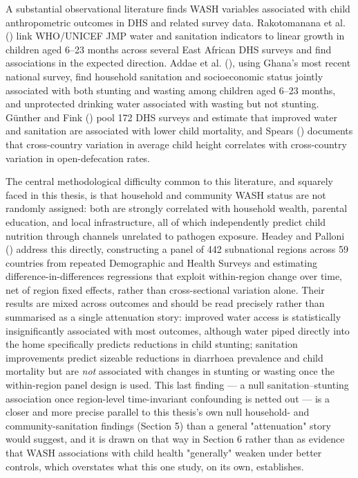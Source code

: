 A substantial observational literature finds WASH variables associated with child anthropometric outcomes in DHS and related survey data. Rakotomanana et al. (\citeyear{Rakotomanana2020}) link WHO/UNICEF JMP water and sanitation indicators to linear growth in children aged 6--23 months across several East African DHS surveys and find associations in the expected direction. Addae et al. (\citeyear{Addae2024}), using Ghana's most recent national survey, find household sanitation and socioeconomic status jointly associated with both stunting and wasting among children aged 6--23 months, and unprotected drinking water associated with wasting but not stunting. Günther and Fink (\citeyear{Gunther2010}) pool 172 DHS surveys and estimate that improved water and sanitation are associated with lower child mortality, and Spears (\citeyear{Spears2013}) documents that cross-country variation in average child height correlates with cross-country variation in open-defecation rates.

The central methodological difficulty common to this literature, and squarely faced in this thesis, is that household and community WASH status are not randomly assigned: both are strongly correlated with household wealth, parental education, and local infrastructure, all of which independently predict child nutrition through channels unrelated to pathogen exposure. Headey and Palloni (\citeyear{HeadeyPalloni2019}) address this directly, constructing a panel of 442 subnational regions across 59 countries from repeated Demographic and Health Surveys and estimating difference-in-differences regressions that exploit within-region change over time, net of region fixed effects, rather than cross-sectional variation alone. Their results are mixed across outcomes and should be read precisely rather than summarised as a single attenuation story: improved water access is statistically insignificantly associated with most outcomes, although water piped directly into the home specifically predicts reductions in child stunting; sanitation improvements predict sizeable reductions in diarrhoea prevalence and child mortality but are \textit{not} associated with changes in stunting or wasting once the within-region panel design is used. This last finding --- a null sanitation--stunting association once region-level time-invariant confounding is netted out --- is a closer and more precise parallel to this thesis's own null household- and community-sanitation findings (Section 5) than a general "attenuation" story would suggest, and it is drawn on that way in Section 6 rather than as evidence that WASH associations with child health "generally" weaken under better controls, which overstates what this one study, on its own, establishes.

